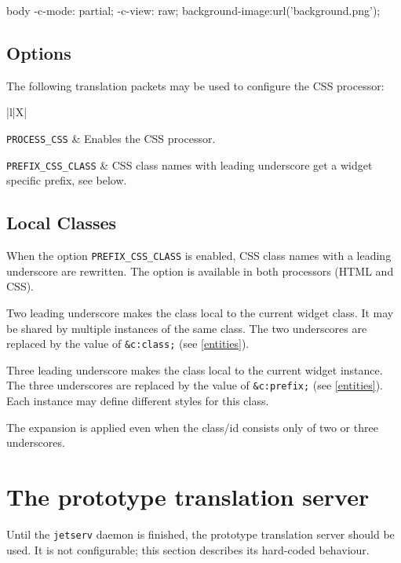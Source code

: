 \documentclass[a4paper,12pt]{article}
\begin{document}
\begin{verbatim*}
body {
  -c-mode: partial;
  -c-view: raw;
  background-image:url('background.png');
}
\end{verbatim*}

\subsection{Options}

The following translation packets may be used to configure the
CSS processor:

\begin{longtabu*}{|l|X|}
\hline

\verb|PROCESS_CSS| & Enables the CSS processor. \\

\hline

\verb|PREFIX_CSS_CLASS| & CSS class names with leading underscore
get a widget specific prefix, see below. \\

\hline
\end{longtabu*}


\subsection{Local Classes}
\label{prefix_css_class}

When the option \verb|PREFIX_CSS_CLASS| is enabled, CSS class
names with a leading underscore are rewritten.  The option is
available in both processors (HTML and CSS).

Two leading underscore makes the class local to the current
widget class.  It may be shared by multiple instances of the same
class.  The two underscores are replaced by the value of
\verb|&c:class;| (see \ref{entities}).

Three leading underscore makes the class local to the current widget
instance.  The three underscores are replaced by the value of
\verb|&c:prefix;| (see \ref{entities}).  Each instance may define
different styles for this class.

The expansion is applied even when the class/id consists only of two
or three underscores.


\section{The prototype translation server}

Until the \texttt{jetserv} daemon is finished, the prototype
translation server should be used.  It is not configurable; this
section describes its hard-coded behaviour.
\end{document}
